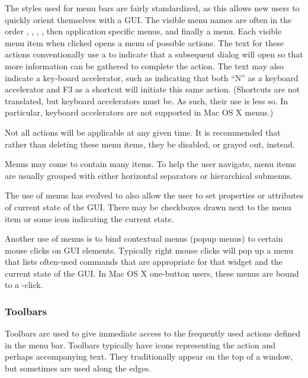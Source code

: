 The styles used for menu bars are fairly standardized, as this allows
new users to quickly orient themselves with a GUI. The visible menu
names are often in the order , , ,
, then application specific menus, and finally a
 menu. Each visible menu item when clicked opens a menu of
possible actions. The text for these actions conventionally use a
  to indicate that a subsequent dialog will open so that
more information can be gathered to complete the action. The text may
also indicate a key-board accelerator, such as  indicating that both ``N'' as a keyboard
accelerator and F3 as a shortcut will initiate this same
action. (Shortcuts are not translated, but keyboard accelerators must
be. As such, their use is less so. In particular, keyboard
accelerators are not supported in Mac OS X menus.)

Not all actions will be applicable at any given time. It is
recommended that rather than deleting these menu items, they be
disabled, or grayed out, instead. %

Menus may come to contain many items. To help the user navigate, menu
items are usually grouped with either horizontal separators or
hierarchical submenus. %

The use of menus has evolved to also allow the user to set properties
or attributes of current state of the GUI. There may be checkboxes
drawn next to the menu item or some icon indicating the current state.

Another use of menus is to bind contextual menus (popup menus) to
certain mouse clicks on GUI elements. Typically right mouse clicks
will pop up a menu that lists often-used commands that are appropriate
for that widget and the current state of the GUI. In Mac OS X
one-button users, these menus are bound to a -click.

\subsubsection{Toolbars}
\label{sec:GUI:toolbars}

Toolbars are used to give immediate access to the frequently used actions
defined in the menu bar. Toolbars typically have icons representing the
action and perhaps accompanying text. They traditionally appear on the
top of a window, but sometimes are used along the edges. 

